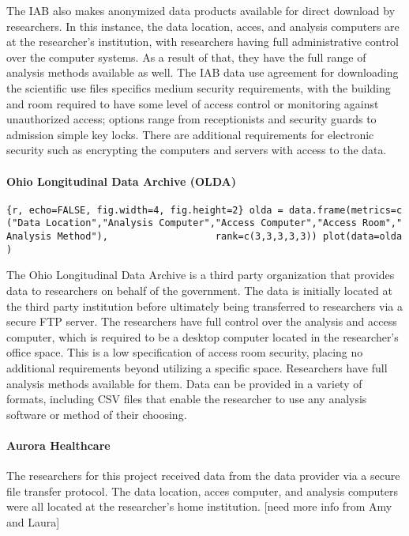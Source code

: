 The IAB also makes anonymized data products available for direct
download by researchers. In this instance, the data location, acces, and
analysis computers are at the researcher's institution, with researchers
having full administrative control over the computer systems. As a
result of that, they have the full range of analysis methods available
as well. The IAB data use agreement for downloading the scientific use
files specifics medium security requirements, with the building and room
required to have some level of access control or monitoring against
unauthorized access; options range from receptionists and security
guards to admission simple key locks. There are additional requirements
for electronic security such as encrypting the computers and servers
with access to the data.

\hypertarget{ohio-longitudinal-data-archive-olda}{%
\paragraph{Ohio Longitudinal Data Archive
(OLDA)}\label{ohio-longitudinal-data-archive-olda}}

\texttt{\{r,\ echo=FALSE,\ fig.width=4,\ fig.height=2\}\ olda\ =\ data.frame(metrics=c("Data\ Location","Analysis\ Computer","Access\ Computer","Access\ Room","Analysis\ Method"),\ \ \ \ \ \ \ \ \ \ \ \ \ \ \ \ \ \ \ rank=c(3,3,3,3,3))\ plot(data=olda)}

The Ohio Longitudinal Data Archive is a third party organization that
provides data to researchers on behalf of the government. The data is
initially located at the third party institution before ultimately being
transferred to researchers via a secure FTP server. The researchers have
full control over the analysis and access computer, which is required to
be a desktop computer located in the researcher's office space. This is
a low specification of access room security, placing no additional
requirements beyond utilizing a specific space. Researchers have full
analysis methods available for them. Data can be provided in a variety
of formats, including CSV files that enable the researcher to use any
analysis software or method of their choosing.

\hypertarget{aurora-healthcare}{%
\paragraph{Aurora Healthcare}\label{aurora-healthcare}}

The researchers for this project received data from the data provider
via a secure file transfer protocol. The data location, acces computer,
and analysis computers were all located at the researcher's home
institution. {[}need more info from Amy and Laura{]}

